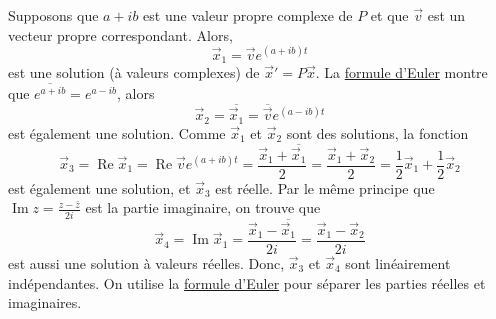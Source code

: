Supposons que $a + ib$ est une valeur propre complexe de $P$ et que $\vec{v}$
est un vecteur propre correspondant. Alors, 
\begin{equation*}
\vec{x}_1 = \vec{v} e^{(a+ib)t}
\end{equation*}
est une solution (à valeurs complexes) de
${\vec{x}}' = P \vec{x}$. La \hyperref[eulersformula]{formule d'Euler} montre que
$\overline{e^{a+ib}} =
e^{a-ib}$,
alors
\begin{equation*}
\vec{x}_2 = \overline{\vec{x}_1} = \overline{\vec{v}} e^{(a-ib)t}
\end{equation*}
est également une solution. Comme $\vec{x}_1$ et $\vec{x}_2$ sont des solutions, la fonction
\begin{equation*}
\vec{x}_3 =
\operatorname{Re} \vec{x}_1 =
\operatorname{Re} \vec{v} e^{(a+ib)t} =
\frac{\vec{x}_1 + \overline{\vec{x}_1}}{2} =
\frac{\vec{x}_1 + \vec{x}_2}{2} 
=
\frac{1}{2} \vec{x}_1 + \frac{1}{2}\vec{x}_2
\end{equation*}
est également une solution, et $\vec{x}_3$ est réelle. Par le même principe que
$\operatorname{Im} z = \frac{z-\bar{z}}{2i}$ est la partie imaginaire, on trouve que
\begin{equation*}
\vec{x}_4 =
\operatorname{Im} \vec{x}_1 =
\frac{\vec{x}_1 - \overline{\vec{x}_1}}{2i} =
\frac{\vec{x}_1 - \vec{x}_2}{2i} 
\end{equation*}
est aussi une solution à valeurs réelles. Donc, $\vec{x}_3$ et
$\vec{x}_4$ sont linéairement indépendantes. On utilise la \hyperref[eulersformula]{formule d'Euler} pour séparer les parties réelles et imaginaires.

\medskip

